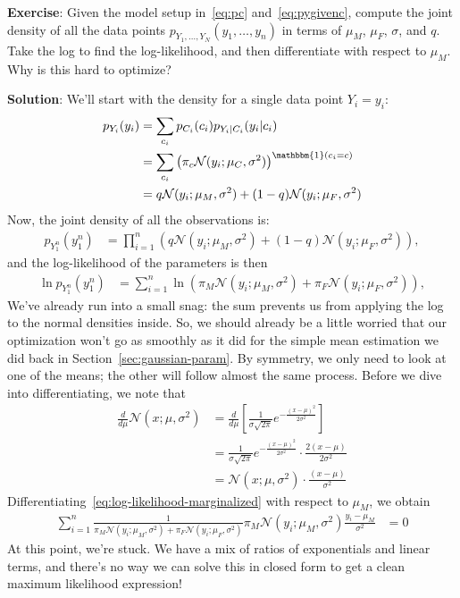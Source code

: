 \documentclass[12pt]{article}
\newcommand{\N}{\mathcal{N}}
\newcommand{\indicator}{\mathbbm{1}}
\begin{document}
    \noindent \textbf{Exercise}: Given the model setup in~\eqref{eq:pc}
    and~\eqref{eq:pygivenc}, compute the joint density of all the data points
    $p_{Y_1, \ldots, Y_N}(y_1, \ldots, y_n)$ in terms of $\mu_M$, $\mu_F$,
    $\sigma$, and $q$. Take the log to find the log-likelihood, and then
    differentiate with respect to $\mu_M$. Why is this hard to optimize?

    \noindent \textbf{Solution}: We'll start with the density for a single data
    point $Y_i = y_i$:
    \begin{align*}
        p_{Y_i}(y_i) 
        &= \sum_{c_i} p_{C_i}(c_i) p_{Y_i|C_i}(y_i | c_i) \\
        &= \sum_{c_i} \left(\pi_c \N(y_i; \mu_C, \sigma^2)\right)^{\indicator(c_i = c)} \\
        &= q\N(y_i; \mu_M, \sigma^2) + (1-q)\N(y_i; \mu_F, \sigma^2)
    \end{align*}
    Now, the joint density of all the observations is:
    \begin{align*}
        p_{Y_1^n}(y_1^n) 
        &= \prod_{i=1}^n \left(q\N(y_i; \mu_M, \sigma^2) + (1-q)\N(y_i; \mu_F, \sigma^2) \right),
    \end{align*}
    and the log-likelihood of the parameters is then
    \begin{align}
        \label{eq:log-likelihood-marginalized} \ln p_{Y_1^n}(y_1^n) 
        &= \sum_{i=1}^n \ln\left(\pi_M\N(y_i; \mu_M, \sigma^2) + \pi_F\N(y_i; \mu_F, \sigma^2) \right),
    \end{align}
    We've already run into a small snag: the sum prevents us from applying the
    log to the normal densities inside. So, we should already be a little worried that
    our optimization won't go as smoothly as it did for the simple mean estimation we
    did back in Section~\ref{sec:gaussian-param}. By symmetry, we only need to look at one
    of the means; the other will follow almost the same process. Before we dive into
    differentiating, we note that
    \begin{align*}
        \frac{d}{d\mu} \N(x; \mu, \sigma^2) 
        &= \frac{d}{d\mu} \left[\frac{1}{\sigma\sqrt{2\pi}} e^{-\frac{(x-\mu)^2}{2\sigma^2}} \right] \\
        &=  \frac{1}{\sigma\sqrt{2\pi}} e^{-\frac{(x-\mu)^2}{2\sigma^2}} \cdot \frac{2(x-\mu)}{2\sigma^2} \\
        &=  \mathcal{N}(x ; \mu, \sigma^2) \cdot \frac{(x-\mu)}{\sigma^2}
    \end{align*}
    Differentiating~\eqref{eq:log-likelihood-marginalized} with respect to $\mu_M$, we obtain
    \begin{align}
        \label{eq:derivative}
            \sum_{i=1}^n \frac{1}{\pi_M\N(y_i; \mu_M, \sigma^2) + \pi_F\N(y_i; \mu_F, \sigma^2)} \pi_M \N(y_i; \mu_M, \sigma^2) \frac{y_i-\mu_M}{\sigma^2} &= 0
    \end{align}
    At this point, we're stuck. We have a mix of ratios of exponentials and
    linear terms, and there's no way we can solve this in closed form to get a
    clean maximum likelihood expression!
\end{document}
